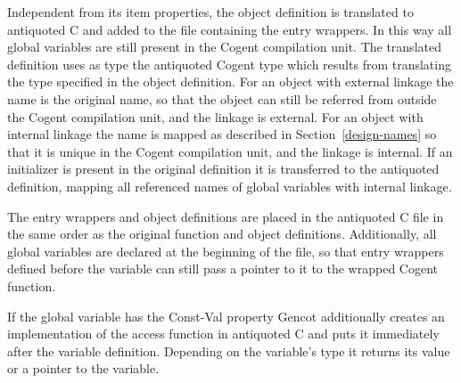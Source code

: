 Independent from its item properties, the object definition is translated to antiquoted C and added to the file 
containing the entry wrappers. In this way all global variables are still present in the Cogent compilation unit.
The translated definition uses as type the antiquoted Cogent type which results from translating the type specified 
in the object definition. For an object with external linkage the name is the original name, so that the object can still
be referred from outside the Cogent compilation unit, and the linkage is external. For an object with internal linkage
the name is mapped as described in Section~\ref{design-names} so that it is unique in the Cogent compilation unit, and
the linkage is internal. If an initializer is present in the original definition it is transferred to the antiquoted
definition, mapping all referenced names of global variables with internal linkage.

The entry wrappers and object definitions are placed in the antiquoted C file in the same order as the original function
and object definitions. Additionally, all global variables are declared at the beginning of the file, so that entry
wrappers defined before the variable can still pass a pointer to it to the wrapped Cogent function.

If the global variable has the Const-Val property Gencot additionally creates an implementation of the access function
in antiquoted C and puts it immediately after the variable definition. Depending on the variable's type it returns its
value or a pointer to the variable. 
